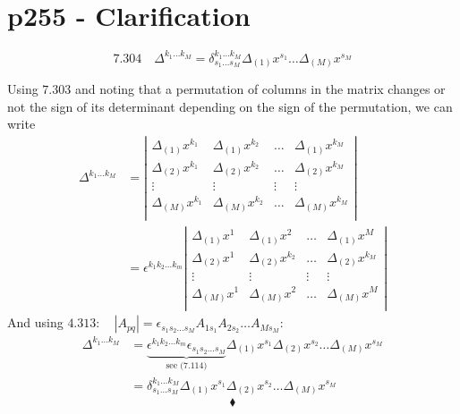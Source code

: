 \section{p255 - Clarification}
\begin{tcolorbox}
$$\mathbf{7.304} \quad \Delta^{k_1\dots k_M}=\delta^{k_1\dots k_M}_{s_1\dots s_M}\Delta_{(1)}x^{s_1} \dots \Delta_{(M)}x^{s_M}$$ 
\end{tcolorbox}
Using $\mathbf{7.303}$ and noting that a permutation of columns in the matrix changes or not  the sign of its determinant depending on the sign of the permutation, we can write 
\begin{align*}
\Delta^{k_1\dots k_M} &= \left|\begin{matrix}
\Delta_{(1)}x^{k_1}&\Delta_{(1)}x^{k_2} &\dots&\Delta_{(1)}x^{k_M}\\
\Delta_{(2)}x^{k_1}&\Delta_{(2)}x^{k_2} &\dots&\Delta_{(2)}x^{k_M}\\
\vdots&\vdots&\vdots&\vdots\\
\Delta_{(M)}x^{k_1}&\Delta_{(M)}x^{k_2} &\dots&\Delta_{(M)}x^{k_M}\\
\end{matrix}\right|\\
&= \epsilon^{k_1 k_2\dots k_m}\left|\begin{matrix}
\Delta_{(1)}x^{1}&\Delta_{(1)}x^{2} &\dots&\Delta_{(1)}x^{M}\\
\Delta_{(2)}x^{1}&\Delta_{(2)}x^{k_2} &\dots&\Delta_{(2)}x^{k_M}\\
\vdots&\vdots&\vdots&\vdots\\
\Delta_{(M)}x^{1}&\Delta_{(M)}x^{2} &\dots&\Delta_{(M)}x^{M}\\
\end{matrix}\right|
\end{align*}
And using $\mathbf{4.313}:\quad \left|A_{pq}\right|= \epsilon_{s_1 s_2 \dots s_M}A_{1 s_1}A_{2 s_2}\dots A_{M s_M}$:
\begin{align*}\Delta^{k_1 \dots k_M} &= \underbrace{\epsilon^{k_1 k_2\dots k_m} \epsilon_{s_1 s_2 \dots s_M}}_{\text{see (7.114)}}\Delta_{(1)}x^{s_1}\Delta_{(2)}x^{s_2} \dots \Delta_{(M)}x^{s_M}\\
&= \delta^{k_1\dots k_M}_{s_1\dots s_M}\Delta_{(1)}x^{s_1}\Delta_{(2)}x^{s_2} \dots \Delta_{(M)}x^{s_M}
\end{align*}
$$\blacklozenge$$
\newpage

